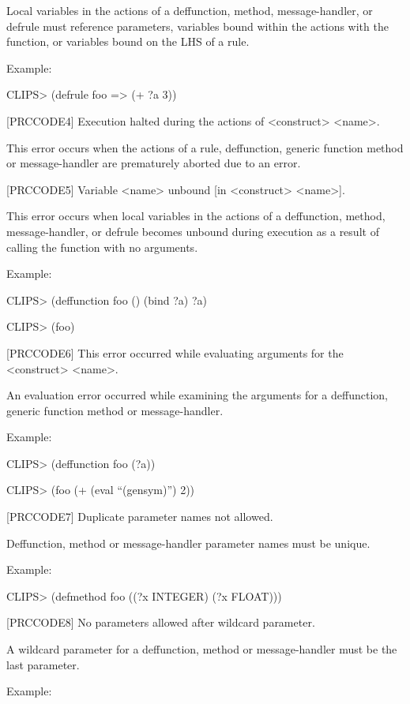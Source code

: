 \documentclass[letterpaper,10pt,english]{sphinxmanual}
\begin{document}
Local variables in the actions of a deffunction, method,
message-handler, or defrule must reference parameters, variables bound
within the actions with the  function, or variables bound on the
LHS of a rule.

Example:

CLIPS\textgreater{} (defrule foo =\textgreater{} (+ ?a 3))

{[}PRCCODE4{]} Execution halted during the actions of \textless{}construct\textgreater{} \textless{}name\textgreater{}.

This error occurs when the actions of a rule, deffunction, generic
function method or message-handler are prematurely aborted due to an
error.

{[}PRCCODE5{]} Variable \textless{}name\textgreater{} unbound {[}in \textless{}construct\textgreater{} \textless{}name\textgreater{}{]}.

This error occurs when local variables in the actions of a deffunction,
method, message-handler, or defrule becomes unbound during execution as
a result of calling the  function with no arguments.

Example:

CLIPS\textgreater{} (deffunction foo () (bind ?a) ?a)

CLIPS\textgreater{} (foo)

{[}PRCCODE6{]} This error occurred while evaluating arguments for the
\textless{}construct\textgreater{} \textless{}name\textgreater{}.

An evaluation error occurred while examining the arguments for a
deffunction, generic function method or message-handler.

Example:

CLIPS\textgreater{} (deffunction foo (?a))

CLIPS\textgreater{} (foo (+ (eval “(gensym)”) 2))

{[}PRCCODE7{]} Duplicate parameter names not allowed.

Deffunction, method or message-handler parameter names must be unique.

Example:

CLIPS\textgreater{} (defmethod foo ((?x INTEGER) (?x FLOAT)))

{[}PRCCODE8{]} No parameters allowed after wildcard parameter.

A wildcard parameter for a deffunction, method or message-handler must
be the last parameter.

Example:
\end{document}
